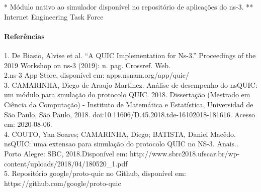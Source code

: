 \documentclass{article}
\begin{document}
\FloatBarrier

* Módulo nativo ao simulador disponível no repositório de aplicações do ns-3.
** Internet Engineering Task Force

\paragraph{Referências}

1. De Biasio, Alvise et al. “A QUIC Implementation for Ns-3.” Proceedings of the 2019 Workshop on ns-3 (2019): n. pag.
Crossref. Web. \\
2.ns-3 App Store, disponível em: apps.nsnam.org/app/quic/ \\
3. CAMARINHA, Diego de Araujo Martinez. Análise de desempenho do nsQUIC: um módulo para smulação do protocolo QUIC.
2018. Dissertação (Mestrado em Ciência da Computação) - Instituto de Matemática e Estatística, Universidad de São Paulo,
São Paulo, 2018. doi:10.11606/D.45.2018.tde-16102018-181616. Acesso em: 2020-08-06. \\
4. COUTO, Yan Soares; CAMARINHA, Diego; BATISTA, Daniel Macêdo. nsQUIC: uma extensao para simulação do protocolo QUIC no
NS-3. Anais.. Porto Alegre: SBC, 2018.Disponível em:
http://www.sbrc2018.ufscar.br/wp-content/uploads/2018/04/180520\_1.pdf \\
5. Repositório google/proto-quic no Github, disponível em: https://github.com/google/proto-quic
\end{document}
